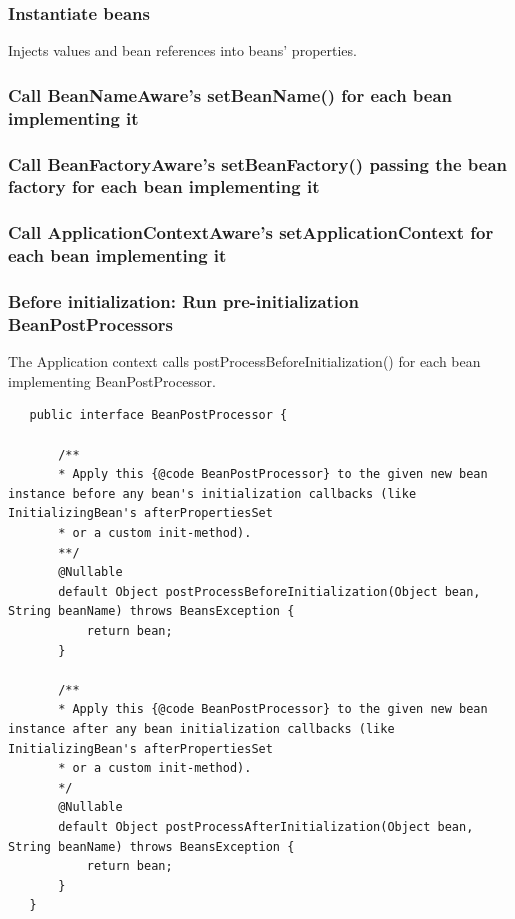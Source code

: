 \documentclass{scrartcl}
\begin{document}
\subsubsection{Instantiate beans}
Injects values and bean references into beans’ properties.

\subsubsection{Call BeanNameAware’s setBeanName() for each bean implementing it}

\subsubsection{Call BeanFactoryAware’s setBeanFactory() passing the bean factory for each bean implementing it}

\subsubsection{Call ApplicationContextAware’s setApplicationContext for each bean implementing it}

\subsubsection{Before initialization: Run pre-initialization BeanPostProcessors}
The Application context calls postProcessBeforeInitialization() for each bean implementing BeanPostProcessor.

\begin{lstlisting}
   public interface BeanPostProcessor {

       /**
       * Apply this {@code BeanPostProcessor} to the given new bean instance before any bean's initialization callbacks (like InitializingBean's afterPropertiesSet
       * or a custom init-method).
       **/
       @Nullable
       default Object postProcessBeforeInitialization(Object bean, String beanName) throws BeansException {
           return bean;
       }

       /**
       * Apply this {@code BeanPostProcessor} to the given new bean instance after any bean initialization callbacks (like InitializingBean's afterPropertiesSet
       * or a custom init-method).
       */
       @Nullable
       default Object postProcessAfterInitialization(Object bean, String beanName) throws BeansException {
           return bean;
       }
   }
\end{lstlisting}
\end{document}
